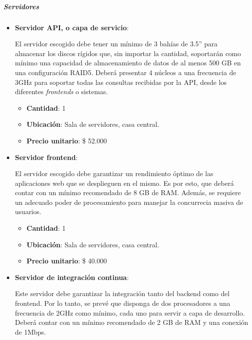 \subparagraph{Servidores}

	\begin{itemize}
		\item \textbf{Servidor API, o capa de servicio}:
        
        El servidor escogido debe tener un mínimo de 3 bahías de 3.5” para almacenar los discos rígidos que, sin importar la cantidad, soportarán como mínimo una capacidad de almacenamiento de datos de al menos 500 GB en una configuración RAID5.
        Deberá presentar 4 núcleos a una frecuencia de 3GHz para soportar todas las consultas recibidas por la API, desde los diferentes \textit{frontends} o sistemas.
        
        \begin{itemize}
            \item \textbf{Cantidad}: 1
            \item \textbf{Ubicación}: Sala de servidores, casa central.
            \item \textbf{Precio unitario}: \$ 52.000
        \end{itemize}

		\item \textbf{Servidor frontend}:
        
        El servidor escogido debe garantizar un rendimiento óptimo de las aplicaciones web que se desplieguen en el mismo. Es por esto, que deberá contar con un mínimo recomendado de 8 GB de RAM. 
        Además, se requiere un adecuado poder de procesamiento para manejar la concurrecia masiva de usuarios.
        
        \begin{itemize}
            \item \textbf{Cantidad}: 1
            \item \textbf{Ubicación}: Sala de servidores, casa central.
            \item \textbf{Precio unitario}: \$ 40.000
        \end{itemize}
        
		\item \textbf{Servidor de integración continua}:
        
        Este servidor debe garantizar la integración tanto del backend como del frontend.
        Por lo tanto, se prevé que disponga de dos procesadores a una frecuencia de 2GHz como mínimo, cada uno para servir a capa de desarrollo. Deberá contar con un mínimo recomendado de 2 GB de RAM y una conexión de 1Mbps.
        

\end{itemize}
